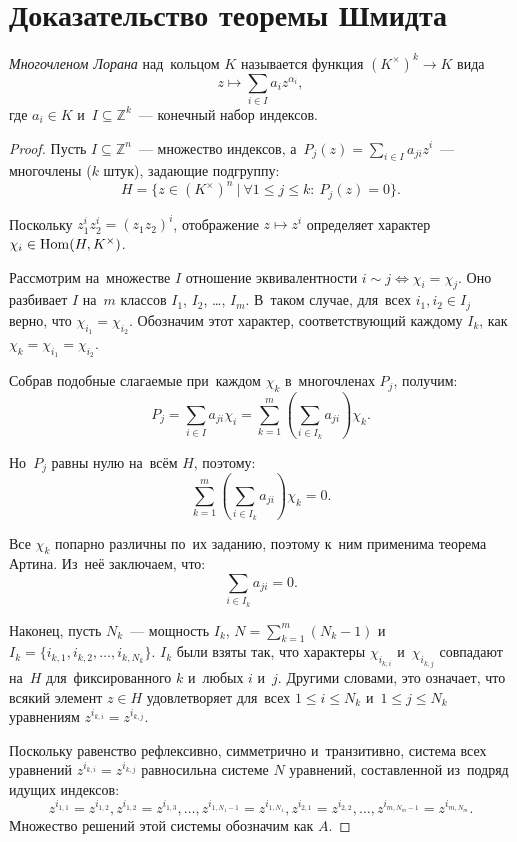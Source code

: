 \documentclass[a4paper,oneside]{article}
\begin{document}
\section{Доказательство теоремы Шмидта}

\textit{Многочленом Лорана} над~кольцом $K$ называется функция $(K^\times)^k \rightarrow K$ вида
$$
    z \mapsto \sum_{i \in I} a_i z^{\alpha_i},
$$
где $a_i \in K$ и~$I \subseteq \mathbb{Z}^k$~— конечный набор индексов.

\begin{proof}
  Пусть $I \subseteq \mathbb{Z}^n$~— множество индексов,
  а~$P_j(z) = \sum_{i \in I} a_{ji} z^i$~— многочлены ($k$ штук), задающие подгруппу:
  $$
      H = \{ z \in (K^{\times})^n\ |\ \forall 1 \leq j \leq k{:}\ P_j(z) = 0 \}.
  $$

  Поскольку $z_1^{i} z_2^{i} = (z_1 z_2)^i$, отображение $z \mapsto z^i$ определяет
  характер $\chi_i \in \mathrm{Hom}(H, K^{\times})$.

  Рассмотрим на~множестве $I$ отношение эквивалентности $i \sim j \Leftrightarrow \chi_i = \chi_j$.
  Оно разбивает $I$ на~$m$ классов $I_1$, $I_2$, …, $I_m$. В~таком случае, для~всех $i_1, i_2 \in I_j$ верно, что $\chi_{i_1} = \chi_{i_2}$.
  Обозначим этот характер, соответствующий каждому $I_k$, как $\chi_k = \chi_{i_1} = \chi_{i_2}$.

  Собрав подобные слагаемые при~каждом $\chi_k$ в~многочленах $P_j$, получим:
  $$
      P_j = \sum_{i \in I} a_{ji} \chi_i = \sum_{k = 1}^{m} \left( \sum_{i \in I_k} a_{ji} \right) \chi_k.
  $$

  Но~$P_j$ равны нулю на~всём $H$, поэтому:
  $$
  \sum_{k = 1}^{m} \left( \sum_{i \in I_k} a_{ji} \right) \chi_k = 0.
  $$

  Все $\chi_k$ попарно различны по~их заданию, поэтому к~ним применима теорема Артина. Из~неё заключаем, что:
  $$
  \sum_{i \in I_k} a_{ji} = 0.
  $$

  Наконец, пусть $N_k$~— мощность $I_k$, $N = \sum_{k = 1}^m (N_k - 1)$ и~$I_k = \{i_{k, 1},\allowbreak i_{k, 2},\allowbreak \ldots,\allowbreak i_{k, N_k}\}$.
  $I_k$ были взяты так, что характеры $\chi_{i_{k, i}}$ и~$\chi_{i_{k, j}}$ совпадают на~$H$ для~фиксированного $k$ и~любых $i$ и~$j$.
  Другими словами, это означает, что всякий элемент $z \in H$ удовлетворяет для~всех $1 \leq i \leq N_k$ и~$1 \leq j \leq N_k$
  уравнениям $z^{i_{k, i}} = z^{i_{k, j}}$.

  Поскольку равенство рефлексивно, симметрично и~транзитивно, система всех уравнений $z^{i_{k, i}} = z^{i_{k, j}}$ равносильна
  системе $N$ уравнений, составленной из~подряд идущих индексов:
  $$
      z^{i_{1, 1}} = z^{i_{1, 2}}, z^{i_{1, 2}} = z^{i_{1, 3}}, \ldots, z^{i_{1, N_1 - 1}} = z^{i_{1, N_1}}, z^{i_{2, 1}} = z^{i_{2, 2}}, \ldots, z^{i_{m, N_m - 1}} = z^{i_{m, N_m}}.
  $$
  Множество решений этой системы обозначим как $A$.


\end{proof}
\end{document}
